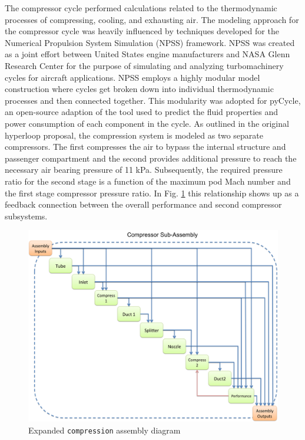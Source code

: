 \documentclass[heading.tex]{subfiles}
\begin{document}
The compressor cycle performed calculations related to the thermodynamic processes of compressing, cooling, and exhausting air. 
The modeling approach for the compressor cycle was heavily influenced by
techniques developed for the Numerical Propulsion System Simulation (NPSS) framework. 
NPSS was created as a joint effort between United States engine manufacturers and NASA Glenn Research Center for the purpose of 
simulating and analyzing turbomachinery cycles for aircraft applications\cite{Lytle}. NPSS employs a highly modular model construction
where cycles get broken down into individual thermodynamic processes and then connected together. 
This modularity was adopted for pyCycle,
an open-source adaption of the tool used to predict the fluid properties and power consumption of each component in the cycle. 
As outlined in the original hyperloop proposal, the compression system is modeled as two separate compressors.
The first compresses the air to bypass the internal structure and passenger compartment
and the second provides additional pressure to reach the necessary air bearing pressure of 11 kPa. 
Subsequently, the required pressure ratio for the second stage is a function of the maximum pod Mach number
and the first stage compressor pressure ratio.
In Fig. \ref{f:compressorXDSM} this relationship shows up as a feedback connection between
the overall performance and second compressor subsystems. 

\begin{figure}[H]
\centering
\includegraphics[width=\textwidth]{images/compAssembly.png}
\caption{Expanded \texttt{compression} assembly diagram}
\label{f:compressorXDSM}
\end{figure}
\end{document}
